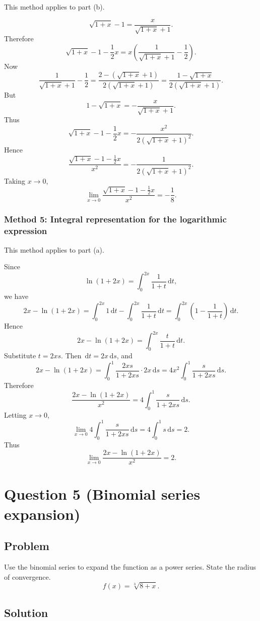 \documentclass[12pt]{article}
\newcommand{\dd}{\,\mathrm{d}}
\begin{document}
This method applies to part (b).

\[
\sqrt{1+x}-1
=
\frac{x}{\sqrt{1+x}+1}.
\]
Therefore
\[
\sqrt{1+x}-1-\frac12x
=
x\left(\frac1{\sqrt{1+x}+1}-\frac12\right).
\]
Now
\[
\frac1{\sqrt{1+x}+1}-\frac12
=
\frac{2-(\sqrt{1+x}+1)}{2(\sqrt{1+x}+1)}
=
\frac{1-\sqrt{1+x}}{2(\sqrt{1+x}+1)}.
\]
But
\[
1-\sqrt{1+x}
=
-\frac{x}{\sqrt{1+x}+1}.
\]
Thus
\[
\sqrt{1+x}-1-\frac12x
=
-\frac{x^2}{2(\sqrt{1+x}+1)^2}.
\]
Hence
\[
\frac{\sqrt{1+x}-1-\frac12x}{x^2}
=
-\frac{1}{2(\sqrt{1+x}+1)^2}.
\]
Taking \(x\to0\),
\[
\boxed{
\lim_{x\to0}\frac{\sqrt{1+x}-1-\frac12x}{x^2}
=
-\frac18.
}
\]

\newpage
\subsubsection{Method 5: Integral representation for the logarithmic expression}

This method applies to part (a).

Since
\[
\ln(1+2x)=\int_0^{2x}\frac{1}{1+t}\dd t,
\]
we have
\[
2x-\ln(1+2x)
=
\int_0^{2x}1\dd t-\int_0^{2x}\frac{1}{1+t}\dd t
=
\int_0^{2x}\left(1-\frac{1}{1+t}\right)\dd t.
\]
Hence
\[
2x-\ln(1+2x)
=
\int_0^{2x}\frac{t}{1+t}\dd t.
\]
Substitute \(t=2xs\). Then \(\dd t=2x\dd s\), and
\[
2x-\ln(1+2x)
=
\int_0^1\frac{2xs}{1+2xs}\cdot 2x\dd s
=
4x^2\int_0^1\frac{s}{1+2xs}\dd s.
\]
Therefore
\[
\frac{2x-\ln(1+2x)}{x^2}
=
4\int_0^1\frac{s}{1+2xs}\dd s.
\]
Letting \(x\to0\),
\[
\lim_{x\to0}
4\int_0^1\frac{s}{1+2xs}\dd s
=
4\int_0^1s\dd s
=
2.
\]
Thus
\[
\boxed{
\lim_{x\to0}\frac{2x-\ln(1+2x)}{x^2}=2.
}
\]


\newpage
\section{Question 5 (Binomial series expansion)}

\subsection{Problem}
Use the binomial series to expand the function as a power series. State the radius of convergence.
\[
f(x)=\sqrt[3]{8+x}.
\]



\bigskip
\subsection{Solution}
\end{document}
